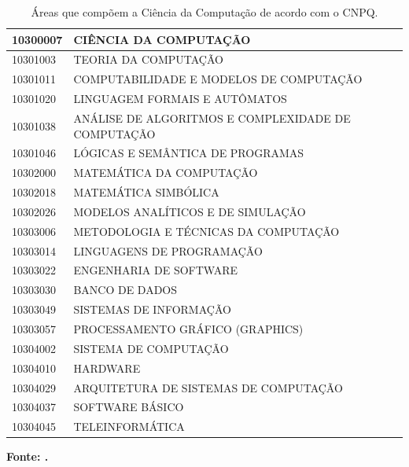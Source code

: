 \begin{table}[t]
	\caption{Áreas que compõem a Ciência da Computação de acordo com o CNPQ.}
	\label{tab:AreasCNPQ}
	\begin{tabular}{|l|l|}
		\hline
		\textbf{10300007} & \textbf{CIÊNCIA DA COMPUTAÇÃO}                     \\ \hline
		10301003          & TEORIA DA COMPUTAÇÃO                               \\ \hline
		10301011          & COMPUTABILIDADE E MODELOS DE COMPUTAÇÃO            \\ \hline
		10301020          & LINGUAGEM FORMAIS E AUTÔMATOS                      \\ \hline
		10301038          & ANÁLISE DE ALGORITMOS E COMPLEXIDADE DE COMPUTAÇÃO \\ \hline
		10301046          & LÓGICAS E SEMÂNTICA DE PROGRAMAS                   \\ \hline
		10302000          & MATEMÁTICA DA COMPUTAÇÃO                           \\ \hline
		10302018          & MATEMÁTICA SIMBÓLICA                               \\ \hline
		10302026          & MODELOS ANALÍTICOS E DE SIMULAÇÃO                  \\ \hline
		10303006          & METODOLOGIA E TÉCNICAS DA COMPUTAÇÃO               \\ \hline
		10303014          & LINGUAGENS DE PROGRAMAÇÃO                          \\ \hline
		10303022          & ENGENHARIA DE SOFTWARE                             \\ \hline
		10303030          & BANCO DE DADOS                                     \\ \hline
		10303049          & SISTEMAS DE INFORMAÇÃO                             \\ \hline
		10303057          & PROCESSAMENTO GRÁFICO (GRAPHICS)                   \\ \hline
		10304002          & SISTEMA DE COMPUTAÇÃO                              \\ \hline
		10304010          & HARDWARE                                           \\ \hline
		10304029          & ARQUITETURA DE SISTEMAS DE COMPUTAÇÃO              \\ \hline
		10304037          & SOFTWARE BÁSICO                                    \\ \hline
		10304045          & TELEINFORMÁTICA                                    \\ \hline
	\end{tabular}
	\newline \footnotesize \textbf{Fonte: \cite{Capes2018}.}
\end{table}

